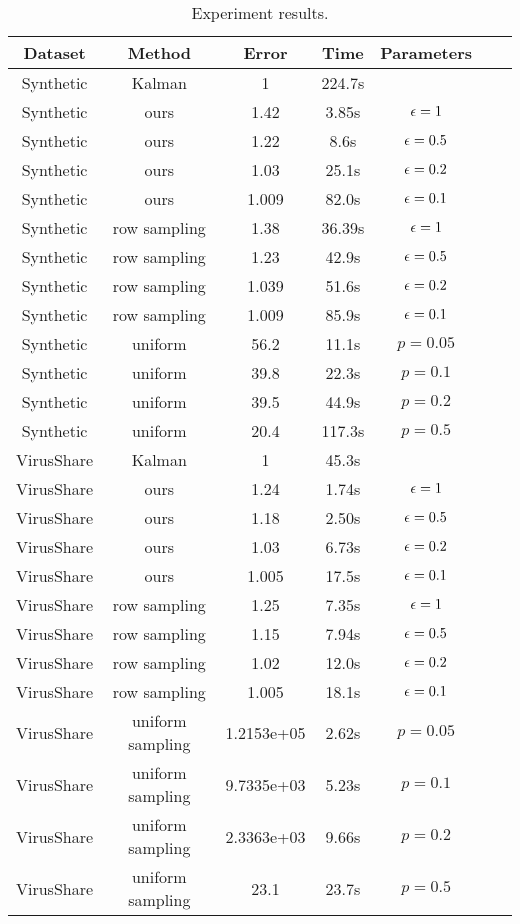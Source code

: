 \begin{table}[!ht]
    \centering
    \begin{tabular}{|c|c|c|c|c|c|c|}
    \hline
    Dataset    & Method & Error & Time & Parameters  \\  \hline
    Synthetic & Kalman &  1 & 224.7s &   \\ \hline
    Synthetic & ours &   1.42 & 3.85s & $\epsilon=1$  \\ \hline
    Synthetic & ours &   1.22 & 8.6s & $\epsilon=0.5$  \\ \hline
    Synthetic & ours &   1.03 & 25.1s & $\epsilon=0.2$  \\ \hline
    Synthetic & ours &    1.009 & 82.0s & $\epsilon=0.1$ \\ \hline
    Synthetic & row sampling &   1.38 & 36.39s & $\epsilon=1$   \\ \hline
    Synthetic & row sampling &   1.23 & 42.9s & $\epsilon=0.5$  \\ \hline
    Synthetic & row sampling &   1.039 & 51.6s & $\epsilon=0.2$  \\ \hline
    Synthetic & row sampling &   1.009& 85.9s & $\epsilon=0.1$  \\ \hline
    Synthetic & uniform &   56.2 & 11.1s & $p=0.05$  \\ \hline
    Synthetic & uniform &   39.8 & 22.3s & $p=0.1$  \\ \hline
    Synthetic & uniform &   39.5 & 44.9s & $p=0.2$ \\ \hline
    Synthetic & uniform &  20.4 & 117.3s & $p=0.5$ \\ 
    \Xhline{3\arrayrulewidth}
    VirusShare & Kalman & 1 & 45.3s &  \\ \hline
    VirusShare & ours & 1.24 & 1.74s & $\epsilon = 1$   \\ \hline
    VirusShare & ours & 1.18 & 2.50s & $\epsilon = 0.5$   \\ \hline
    VirusShare & ours & 1.03 & 6.73s & $\epsilon = 0.2$    \\ \hline
    VirusShare & ours & 1.005 & 17.5s & $\epsilon = 0.1$    \\ \hline
    VirusShare & row sampling & 1.25 & 7.35s & $\epsilon = 1$  \\ \hline
    VirusShare & row sampling & 1.15 & 7.94s & $\epsilon = 0.5$  \\ \hline
    VirusShare & row sampling & 1.02& 12.0s & $\epsilon = 0.2$  \\ \hline
    VirusShare & row sampling & 1.005 & 18.1s & $\epsilon = 0.1$  \\ \hline
    VirusShare & uniform sampling & 1.2153e+05 & 2.62s & $p = 0.05$  \\ \hline
    VirusShare & uniform sampling & 9.7335e+03 & 5.23s & $p = 0.1$  \\ \hline
    VirusShare & uniform sampling & 2.3363e+03 & 9.66s & $p = 0.2$  \\ \hline
    VirusShare & uniform sampling & 23.1 & 23.7s & $p = 0.5$  \\ \hline
    \end{tabular}
    \caption{Experiment results.}
    \label{tab:experiment}
\end{table}